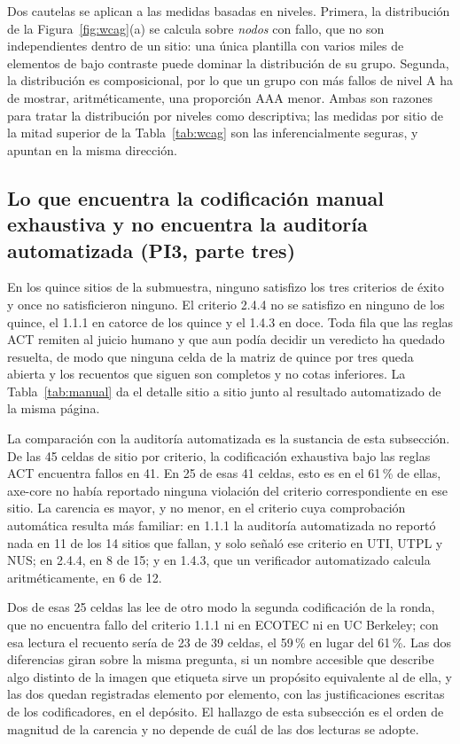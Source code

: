 \documentclass[pdflatex,sn-basic,Numbered,iicol]{sn-jnl}
\theoremstyle{thmstyleone}
\theoremstyle{thmstyletwo}
\theoremstyle{thmstylethree}
\begin{document}
Dos cautelas se aplican a las medidas basadas en niveles. Primera, la distribuci\'on de la Figura~\ref{fig:wcag}(a) se calcula sobre \emph{nodos} con fallo, que no son independientes dentro de un sitio: una \'unica plantilla con varios miles de elementos de bajo contraste puede dominar la distribuci\'on de su grupo. Segunda, la distribuci\'on es composicional, por lo que un grupo con m\'as fallos de nivel A ha de mostrar, aritm\'eticamente, una proporci\'on AAA menor. Ambas son razones para tratar la distribuci\'on por niveles como descriptiva; las medidas por sitio de la mitad superior de la Tabla~\ref{tab:wcag} son las inferencialmente seguras, y apuntan en la misma direcci\'on.

\subsection{Lo que encuentra la codificaci\'on manual exhaustiva y no encuentra la auditor\'ia automatizada (PI3, parte tres)}\label{sec:results-manual}

En los quince sitios de la submuestra, ninguno satisfizo los tres criterios de \'exito y once no satisficieron ninguno. El criterio 2.4.4 no se satisfizo en ninguno de los quince, el 1.1.1 en catorce de los quince y el 1.4.3 en doce. Toda fila que las reglas ACT remiten al juicio humano y que aun pod\'ia decidir un veredicto ha quedado resuelta, de modo que ninguna celda de la matriz de quince por tres queda abierta y los recuentos que siguen son completos y no cotas inferiores. La Tabla~\ref{tab:manual} da el detalle sitio a sitio junto al resultado automatizado de la misma p\'agina.

La comparaci\'on con la auditor\'ia automatizada es la sustancia de esta subsecci\'on. De las 45 celdas de sitio por criterio, la codificaci\'on exhaustiva bajo las reglas ACT encuentra fallos en 41. En 25 de esas 41 celdas, esto es en el 61\,\% de ellas, axe-core no hab\'ia reportado ninguna violaci\'on del criterio correspondiente en ese sitio. La carencia es mayor, y no menor, en el criterio cuya comprobaci\'on autom\'atica resulta m\'as familiar: en 1.1.1 la auditor\'ia automatizada no report\'o nada en 11 de los 14 sitios que fallan, y solo se\~nal\'o ese criterio en UTI, UTPL y NUS; en 2.4.4, en 8 de 15; y en 1.4.3, que un verificador automatizado calcula aritm\'eticamente, en 6 de 12.

Dos de esas 25 celdas las lee de otro modo la segunda codificaci\'on de la ronda, que no encuentra fallo del criterio 1.1.1 ni en ECOTEC ni en UC Berkeley; con esa lectura el recuento ser\'ia de 23 de 39 celdas, el 59\,\% en lugar del 61\,\%. Las dos diferencias giran sobre la misma pregunta, si un nombre accesible que describe algo distinto de la imagen que etiqueta sirve un prop\'osito equivalente al de ella, y las dos quedan registradas elemento por elemento, con las justificaciones escritas de los codificadores, en el dep\'osito. El hallazgo de esta subsecci\'on es el orden de magnitud de la carencia y no depende de cu\'al de las dos lecturas se adopte.
\end{document}
